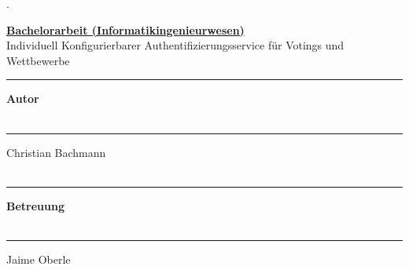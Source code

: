 \begin{titlepage}


\begin{minipage}[b]{0.117\textwidth}
\hskip 0.05cm
\end{minipage}
\begin{minipage}[b]{0.91\textwidth}
\begin{tiny}.\end{tiny}\vskip 2.8cm
	{\huge
	
	\textbf{\underline{Bachelorarbeit (Informatikingenieurwesen)}}\\
	
	Individuell Konfigurierbarer Authentifizierungsservice für Votings und Wettbewerbe
	\vskip 3.5cm}
	
	\begin{minipage}[b]{0.27\textwidth}
	\hrule\vskip 0.5cm
		\textbf{Autor}\\
		\\
	\end{minipage}
	\begin{minipage}[b]{0.03\textwidth}
	\hskip 0.5cm
	\end{minipage}
	\begin{minipage}[b]{0.7\textwidth}
	\hrule\vskip 0.5cm
	    Christian Bachmann\\
	    \\
	\end{minipage}
	
	\begin{minipage}[b]{0.27\textwidth}
	\hrule\vskip 0.5cm
		\textbf{Betreuung}\\
		\\
	\end{minipage}
	\begin{minipage}[b]{0.03\textwidth}
	\hskip 0.5cm
	\end{minipage}
	\begin{minipage}[b]{0.7\textwidth}
	\hrule\vskip 0.5cm
		Jaime Oberle\\
		 \\
	
	\end{minipage}
	
	

\end{minipage}
\end{titlepage}

